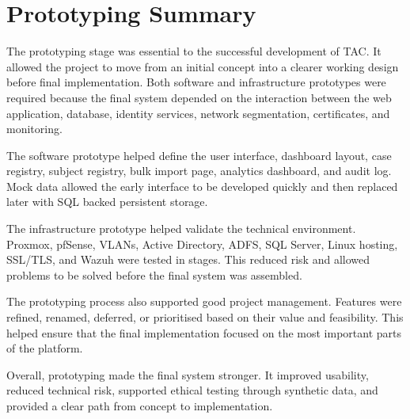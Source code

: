 
\section{Prototyping Summary}

The prototyping stage was essential to the successful development of TAC. It allowed the project to move from an initial concept into a clearer working design before final implementation. Both software and infrastructure prototypes were required because the final system depended on the interaction between the web application, database, identity services, network segmentation, certificates, and monitoring.

The software prototype helped define the user interface, dashboard layout, case registry, subject registry, bulk import page, analytics dashboard, and audit log. Mock data allowed the early interface to be developed quickly and then replaced later with SQL backed persistent storage.

The infrastructure prototype helped validate the technical environment. Proxmox, pfSense, VLANs, Active Directory, ADFS, SQL Server, Linux hosting, SSL/TLS, and Wazuh were tested in stages. This reduced risk and allowed problems to be solved before the final system was assembled.

The prototyping process also supported good project management. Features were refined, renamed, deferred, or prioritised based on their value and feasibility. This helped ensure that the final implementation focused on the most important parts of the platform.

Overall, prototyping made the final system stronger. It improved usability, reduced technical risk, supported ethical testing through synthetic data, and provided a clear path from concept to implementation.

